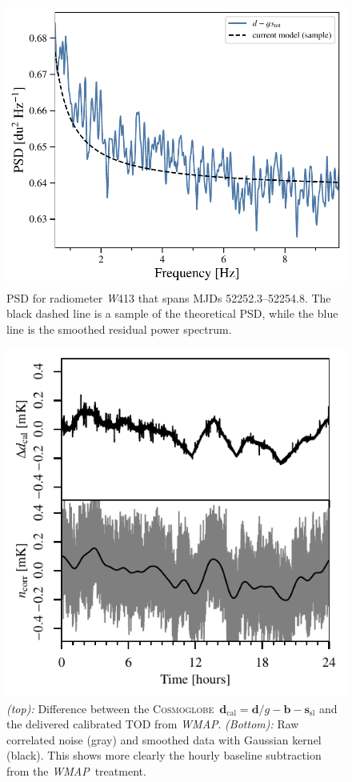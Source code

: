 \documentclass[twocolumn]{../../common/aa}
\def\WMAP{\emph{WMAP}}
\newcommand{\cosmoglobe}{\textsc{Cosmoglobe}}
\newcommand{\W}[0]{\textit W}
\begin{document}
\begin{figure}
	\includegraphics[width=\columnwidth]{figures/ps_test_W4_det1_zoom.pdf}
	\caption{PSD for radiometer \W413 that spans MJDs 52252.3--52254.8. 
	The black dashed line is a sample of the theoretical PSD, while the blue line is the smoothed residual power spectrum.
	}
	\label{fig:W413_psd_zoom}
\end{figure}


\begin{figure}
	\includegraphics[width=\columnwidth]{figures/K113_TOD_diff_10hr.pdf}
	\caption{\textit{(top):} Difference between the \cosmoglobe\ $\boldsymbol d_\mathrm{cal}=\boldsymbol d/g-\boldsymbol b - \boldsymbol s_\mathrm{sl}$ and the delivered calibrated TOD from \WMAP. \textit{(Bottom):} Raw correlated noise (gray) and smoothed data with Gaussian kernel (black). This shows more clearly the hourly baseline subtraction from the \WMAP\ treatment.}
	\label{fig:cal_comp}
\end{figure}
\end{document}

